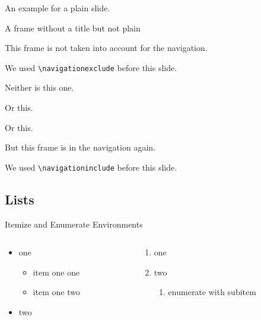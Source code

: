 \documentclass{beamer}
\begin{document}
\begin{frame}[plain]
	An example for a plain slide.
\end{frame}

\begin{frame}
A frame without a title but not plain	
\end{frame}

\navigationexclude
\begin{frame}
	This frame is not taken into account for the navigation.
	
	We used \texttt{\textbackslash navigationexclude} before this slide.
\end{frame}

\begin{frame}
	Neither is this one.
\end{frame}

\begin{frame}
	Or this.
\end{frame}

\begin{frame}
	Or this.
\end{frame}

\navigationinclude
\begin{frame}
	But this frame is in the navigation again.
	
	We used \texttt{\textbackslash navigationinclude} before this slide.
\end{frame}

\subsection{Lists}

\begin{frame}{Itemize and Enumerate Environments}
\begin{columns}
\begin{column}{0.5\textwidth}
   \begin{itemize}
		\item one \begin{itemize}
		\item item one one
		\item item one two
		\end{itemize}
		\item two
	\end{itemize}
\end{column}
\begin{column}{0.5\textwidth}  %
   \begin{enumerate}
\item one
\item two \begin{enumerate}
	\item enumerate with subitem
\end{enumerate}
\end{enumerate}
\end{column}
\end{columns}
\end{frame}
\end{document}
